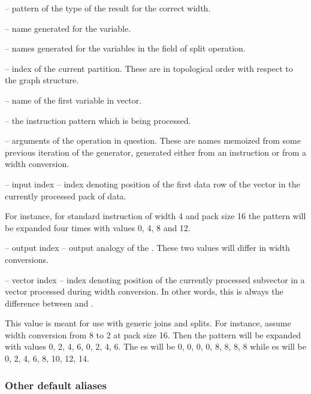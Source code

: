 \begin{description}
\item{} -- pattern of the type of the result for the correct width.
\item{} -- name generated for the variable.
\item{} -- names generated for the variables in the  field of split operation.
\item{} -- index of the current partition. These are in topological order with respect to the graph structure.
\item{}  -- name of the first variable in vector. 
\item{} -- the instruction pattern which is being processed.
\item{} -- arguments of the operation in question. These are names memoized from some previous iteration of the generator, generated either from an instruction or from a width conversion.
\item{} -- input index -- index denoting position of the first data row of the vector in the currently processed pack of data. 

  For instance, for standard instruction of width 4 and pack size 16 the pattern will be expanded four times with values  0, 4, 8 and 12.

\item{} -- output index -- output analogy of the . These two values will differ in width conversions.


\item{} -- vector index -- index denoting position of the currently processed subvector in a vector processed during width conversion. In other words, this is always the difference between  and .

This value is meant for use with generic joins and splits. For instance, assume width conversion from 8 to 2 at pack size 16. Then the  pattern will be expanded with values 0, 2, 4, 6, 0, 2, 4, 6. The es will be 0, 0, 0, 0, 8, 8, 8, 8 while es will be 0, 2, 4, 6, 8, 10, 12, 14.
\end{description}


\subsubsection{Other default aliases}

